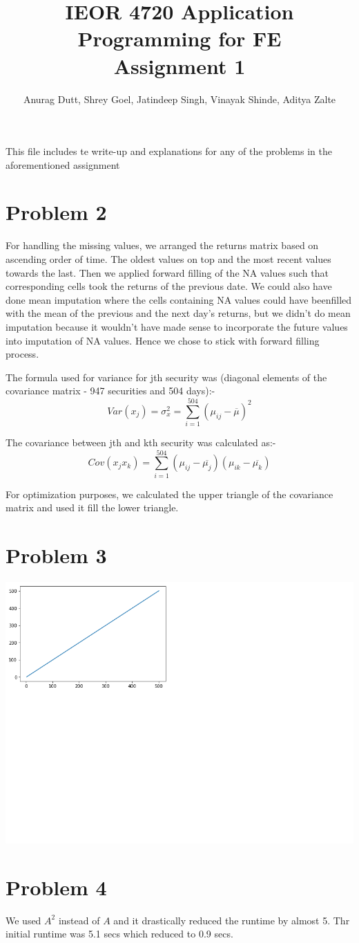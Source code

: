 \documentclass[twoside,11pt]{article}
\title{IEOR 4720 Application Programming for FE \\
  \large Assignment 1
} %
\author{Anurag Dutt, Shrey Goel, Jatindeep Singh, Vinayak Shinde, Aditya Zalte}    %
\begin{document}
\maketitle
This file includes te write-up and explanations for any of the problems in the aforementioned assignment

\section*{Problem 2}
For handling the missing values, we arranged the returns matrix	based on ascending order of time. The oldest values on top and the most	recent values towards the last.	Then we	applied	forward filling of the NA values such	that corresponding cells took the returns of the previous date.	We could also have done	mean imputation	where the cells	containing NA values could have	beenfilled with the mean of the previous and	the next day's returns,	but we didn't do mean imputation because it wouldn't have made sense to	incorporate the	future values into imputation of NA values. Hence we chose to stick with forward filling process.

The formula used for variance for jth security was (diagonal elements of the covariance matrix - 947 securities and 504 days):-
\begin{equation}
  Var(x_j) = \sigma_x^2 = \sum_{i = 1}^{504} (\mu_{ij}-\overline{\mu})^2
\end{equation}

The covariance between jth and kth security was calculated as:-
\begin{equation}
  Cov(x_jx_k) = \sum_{i = 1}^{504} (\mu_{ij}-\overline{\mu_j})(\mu_{ik}-\overline{\mu_k})
\end{equation}

For optimization purposes, we calculated the upper triangle of the covariance matrix and used it fill the lower triangle.

\section*{Problem 3}

\includegraphics{graph_q3.png}

\section*{Problem 4}
We used	$A^2$ instead of $A$ and it drastically reduced the runtime by almost 5. Thr initial runtime was 5.1 secs which reduced to 0.9 secs.
\end{document}
